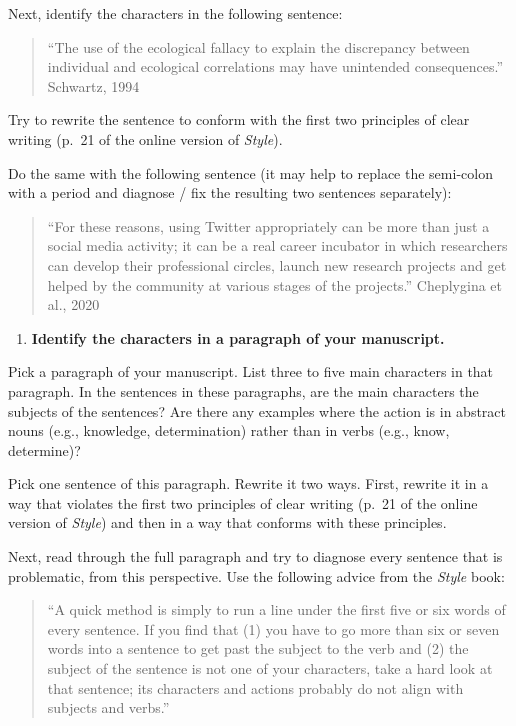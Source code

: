 \documentclass[]{tufte-book}
\providecommand{\tightlist}{%
  \setlength{\itemsep}{0pt}\setlength{\parskip}{0pt}}
\begin{document}
Next, identify the characters in the following sentence:

\begin{quote}
``The use of the ecological fallacy to explain the discrepancy between
individual and ecological correlations may have unintended consequences.''
Schwartz, 1994
\end{quote}

Try to rewrite the sentence to conform with the first two principles of clear
writing (p.~21 of the online version of \emph{Style}).

Do the same with the following sentence (it may help to replace the semi-colon
with a period and diagnose / fix the resulting two sentences separately):

\begin{quote}
``For these reasons, using Twitter appropriately can be more than just a social
media activity; it can be a real career incubator in which researchers can
develop their professional circles, launch new research projects and get helped
by the community at various stages of the projects.'' Cheplygina et al., 2020
\end{quote}

\begin{enumerate}
\def\labelenumi{\arabic{enumi}.}
\setcounter{enumi}{4}
\tightlist
\item
  \textbf{Identify the characters in a paragraph of your manuscript.}
\end{enumerate}

Pick a paragraph of your manuscript. List three to five main characters in that paragraph.
In the sentences in these paragraphs, are the main characters the subjects of the
sentences? Are there any examples where the action is in abstract nouns (e.g., knowledge,
determination) rather than in verbs (e.g., know, determine)?

Pick one sentence of this paragraph. Rewrite it two ways. First, rewrite it in a way that
violates the first two principles of clear writing (p.~21 of the online version of \emph{Style})
and then in a way that conforms with these principles.

Next, read through the full paragraph and try to diagnose every sentence that is
problematic, from this perspective. Use the following advice from the \emph{Style}
book:

\begin{quote}
``A quick method is simply to run a line under the first five or six words of
every sentence. If you find that (1) you have to go more than six or seven words
into a sentence to get past the subject to the verb and (2) the subject of the
sentence is not one of your characters, take a hard look at that sentence; its
characters and actions probably do not align with subjects and verbs.''
\end{quote}
\end{document}
